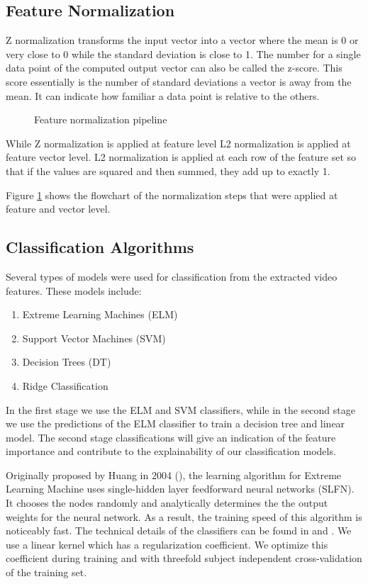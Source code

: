 \subsection{Feature Normalization}
\label{subsection:normalization}
Z normalization transforms the input vector into a vector where the mean is 0 or very close to 0 while the standard deviation is close to 1. The number for a single data point of the computed output vector can also be called the z-score. This score essentially is the number of standard deviations a vector is away from the mean. It can indicate how familiar a data point is relative to the others. 

\begin{figure}[h]
  \centering
  
  \caption{Feature normalization pipeline}
  \label{fig:normpipeline}
\end{figure}

While Z normalization is applied at feature level L2 normalization is applied at feature vector level. L2 normalization is applied at each row of the feature set so that if the values are squared and then summed, they add up to exactly 1. 

Figure \ref{fig:normpipeline} shows the flowchart of the normalization steps that were applied at feature and vector level. 



\subsection{Classification Algorithms}
\label{subsection:classificaiton}
Several types of models were used for classification from the extracted video features. These models include:
\begin{enumerate}
\item Extreme Learning Machines (ELM)
\item Support Vector Machines (SVM)
\item Decision Trees (DT)
\item Ridge Classification
\end{enumerate}
In the first stage we use the ELM and SVM classifiers, while in the second stage we use the predictions of the ELM classifier to train a decision tree and linear model. The second stage classifications will give an indication of the feature importance and contribute to the explainability of our classification models. 

Originally proposed by Huang in 2004 (\cite{huang2004extreme}), the learning algorithm for Extreme Learning Machine uses single-hidden layer feedforward neural networks (SLFN). It chooses the nodes randomly and analytically determines the the output weights for the neural network. As a result, the training speed of this algorithm is noticeably fast. The technical details of the classifiers can be found in \cite{huang2004extreme} and \cite{huang2006extreme}. We use a linear kernel which has a regularization coefficient. We optimize this coefficient during training and with threefold subject independent cross-validation of the training set. 

